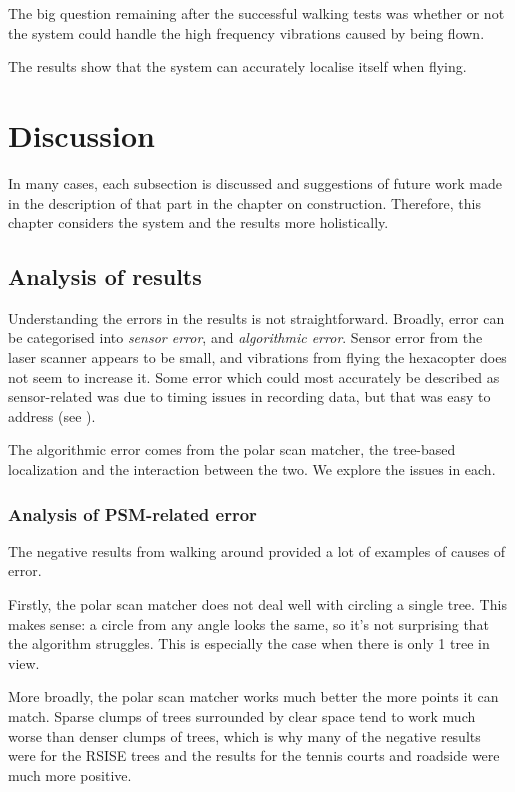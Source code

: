 \documentclass[12pt,oneside,a4paper]{book}
\begin{document}
The big question remaining after the successful walking tests was
whether or not the system could handle the high frequency vibrations
caused by being flown. 

The results show that the system can accurately localise itself when
flying. 

\chapter{Discussion}
\label{cha:discussion}

 In many cases, each subsection is
discussed and suggestions of future work made in the description of
that part in the chapter on construction. Therefore, this chapter
considers the system and the results more holistically.

\section{Analysis of results}
\label{sec:analysis-results}

Understanding the errors in the results is not
straightforward. Broadly, error can be categorised into \emph{sensor
  error}, and \emph{algorithmic error}. Sensor error from the laser
scanner appears to be small, and vibrations from flying the hexacopter
does not seem to increase it. Some error which could most accurately
be described as sensor-related was due to timing issues in recording
data, but that was easy to address (see ).

The algorithmic error comes from the polar scan matcher, the
tree-based localization and the interaction between the two. We
explore the issues in each.

\subsection{Analysis of PSM-related error}
\label{sec:psm-error}

The negative results from walking around provided a lot of examples of
causes of error.

Firstly, the polar scan matcher does not deal well with circling a
single tree. This makes sense: a circle from any angle looks the same,
so it's not surprising that the algorithm struggles. This is
especially the case when there is only 1 tree in view.

More broadly, the polar scan matcher works much better the more points
it can match. Sparse clumps of trees surrounded by clear space tend to
work much worse than denser clumps of trees, which is why many of the
negative results were for the RSISE trees and the results for the
tennis courts and roadside were much more positive.
\end{document}
